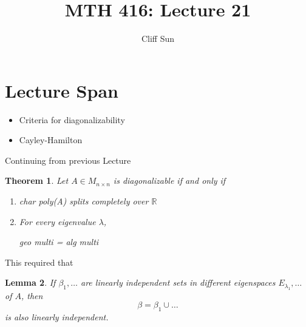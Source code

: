 \documentclass{article}
\title{MTH 416: Lecture 21}
\author{Cliff Sun}
\newtheorem{theorem}{Theorem}[section]
\newtheorem{lemma}[theorem]{Lemma}
\newtheorem{one minute paper}[theorem]{One Minute Paper}
\begin{document}
\maketitle

\section*{Lecture Span}
\begin{itemize}
    \item Criteria for diagonalizability
    \item Cayley-Hamilton
\end{itemize}

Continuing from previous Lecture

\begin{theorem}
    Let $A \in M_{n \times n}$ is diagonalizable if and only if 
    \begin{enumerate}
        \item char poly(A) splits completely over $\mathbb{R}$
        \item For every eigenvalue $\lambda$, 
        \begin{center}
            geo multi = alg multi
        \end{center}
    \end{enumerate}
\end{theorem}

This required that 

\begin{lemma}
    If $\beta_1, \dots$ are linearly independent sets in different eigenspaces $E_{\lambda_1}, \dots$ of $A$, then 
    \begin{equation}
        \beta = \beta_1\cup\dots
    \end{equation}
    is also linearly independent. 
\end{lemma}
\end{document}
